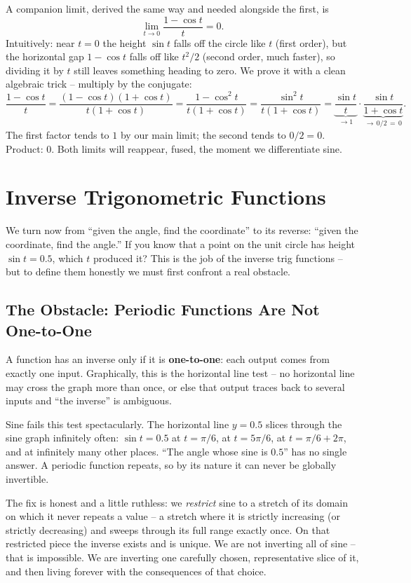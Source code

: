 A companion limit, derived the same way and needed alongside the first, is
\[
  \lim_{t\to 0}\frac{1 - \cos t}{t} = 0.
\]
Intuitively: near $t=0$ the height $\sin t$ falls off the circle like $t$ (first order), but the horizontal gap $1-\cos t$ falls off like $t^2/2$ (second order, much faster), so dividing it by $t$ still leaves something heading to zero. We prove it with a clean algebraic trick -- multiply by the conjugate:
\[
  \frac{1-\cos t}{t}
  = \frac{(1-\cos t)(1+\cos t)}{t(1+\cos t)}
  = \frac{1-\cos^2 t}{t(1+\cos t)}
  = \frac{\sin^2 t}{t(1+\cos t)}
  = \underbrace{\frac{\sin t}{t}}_{\to 1}\cdot \underbrace{\frac{\sin t}{1+\cos t}}_{\to\, 0/2\,=\,0}.
\]
The first factor tends to $1$ by our main limit; the second tends to $0/2 = 0$. Product: $0$. Both limits will reappear, fused, the moment we differentiate sine.

\section{Inverse Trigonometric Functions}
\label{ch04:inverse}

We turn now from ``given the angle, find the coordinate'' to its reverse: ``given the coordinate, find the angle.'' If you know that a point on the unit circle has height $\sin t = 0.5$, which $t$ produced it? This is the job of the inverse trig functions -- but to define them honestly we must first confront a real obstacle.

\subsection{The Obstacle: Periodic Functions Are Not One-to-One}

A function has an inverse only if it is \textbf{one-to-one}: each output comes from exactly one input. Graphically, this is the horizontal line test -- no horizontal line may cross the graph more than once, or else that output traces back to several inputs and ``the inverse'' is ambiguous.

Sine fails this test spectacularly. The horizontal line $y = 0.5$ slices through the sine graph infinitely often: $\sin t = 0.5$ at $t = \pi/6$, at $t = 5\pi/6$, at $t = \pi/6 + 2\pi$, and at infinitely many other places. ``The angle whose sine is $0.5$'' has no single answer. A periodic function repeats, so by its nature it can never be globally invertible.

\begin{intuitionbox}
The fix is honest and a little ruthless: we \emph{restrict} sine to a stretch of its domain on which it never repeats a value -- a stretch where it is strictly increasing (or strictly decreasing) and sweeps through its full range exactly once. On that restricted piece the inverse exists and is unique. We are not inverting all of sine -- that is impossible. We are inverting one carefully chosen, representative slice of it, and then living forever with the consequences of that choice.
\end{intuitionbox}


